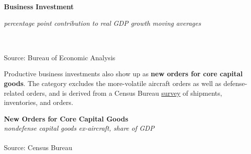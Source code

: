 \documentclass{report}
\newcommand{\tbllink}[1]{\href{https://raw.githubusercontent.com/bdecon/US-chartbook/master/chartbook/data/#1}{\faTable}}
\begin{document}
{{{{{\begin{minipage}{0.76\textwidth}
\vspace{3mm}

\small

 

\end{minipage}

\noindent \normalsize \textbf{Business Investment}\\
\footnotesize{\textit{percentage point contribution to real GDP growth \hspace{36mm} moving averages}\\ \vspace{4mm}
\noindent {} \setlength{\tabcolsep}{3.1pt} \color{black!90}
		{\renewcommand{\arraystretch}{1.55}
		 \begin{tabular}{p{42mm} R{6.7mm} R{6.7mm} R{6.7mm} R{6.7mm} R{6.7mm} 
		   R{7.8mm} R{6.7mm} R{6.7mm} }
			 \hline
		\end{tabular}
		}	\\
		
\vspace{-6mm}
\footnotesize{Source: Bureau of Economic Analysis}

\newpage

\begin{minipage}{0.34\textwidth}

\small Productive business investments also show up as \textbf{new orders for core capital goods}. The category excludes the more-volatile aircraft orders as well as defense-related orders, and is derived from a Census Bureau \href{https://www.census.gov/manufacturing/m3/index.html}{survey} of shipments, inventories, and orders.  \\


\end{minipage} \hspace{6mm}
\begin{minipage}{0.39\textwidth}

\noindent \normalsize \textbf{New Orders for Core Capital Goods}\\
\footnotesize{\textit{nondefense capital goods ex-aircraft, share of GDP}}\\
\noindent \hspace*{-2mm} \\
\footnotesize{Source: Census Bureau} \hspace{23mm} \tbllink{dgno.csv}
\end{minipage}


}}}}}}
\end{document}
